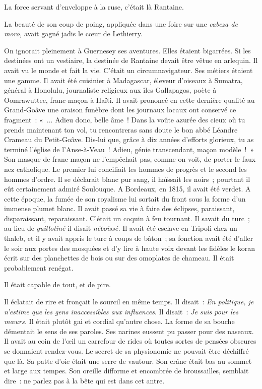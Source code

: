 \documentclass[french,twoside]{book} %
\begin{document}
La force servant d’enveloppe à la ruse, c’était là Rantaine.\par
La beauté de son coup de poing, appliquée dans une foire sur une \emph{cabeza de moro,} avait gagné jadis le cœur de Lethierry.\par
On ignorait pleinement à Guernesey ses aventures. Elles étaient bigarrées. Si les destinées ont un vestiaire, la destinée de Rantaine devait être vêtue en arlequin. Il avait vu le monde et fait la vie. C’était un circumnavigateur. Ses métiers étaient une gamme. Il avait été cuisinier à Madagascar, éleveur d’oiseaux à Sumatra, général à Honolulu, journaliste religieux aux îles Gallapagos, poète à Oomrawuttee, franc-maçon à Haïti. Il avait prononcé en cette dernière qualité au Grand-Goâve une oraison funèbre dont les journaux locaux ont conservé ce fragment : « ... Adieu donc, belle âme ! Dans la voûte azurée des cieux où tu prends maintenant ton vol, tu rencontreras sans doute le bon abbé Léandre Crameau du Petit-Goâve. Dis-lui que, grâce à dix années d’efforts glorieux, tu as terminé l’église de l’Anse-à-Veau ! Adieu, génie transcendant, maçon modèle ! » Son masque de franc-maçon ne  l’empêchait pas, comme on voit, de porter le faux nez catholique. Le premier lui conciliait les hommes de progrès et le second les hommes d’ordre. Il se déclarait blanc pur sang, il haïssait les noirs ; pourtant il eût certainement admiré Soulouque. A Bordeaux, en 1815, il avait été verdet. A cette époque, la fumée de son royalisme lui sortait du front sous la forme d’un immense plumet blanc. Il avait passé sa vie à faire des éclipses, paraissant, disparaissant, reparaissant. C’était un coquin à feu tournant. Il savait du turc ; au lieu de \emph{guillotiné} il disait \emph{néboissé.} Il avait été esclave en Tripoli chez un thaleb, et il y avait appris le turc à coups de bâton ; sa fonction avait été d’aller le soir aux portes des mosquées et d’y lire à haute voix devant les fidèles le koran écrit sur des planchettes de bois ou sur des omoplates de chameau. Il était probablement renégat.\par
Il était capable de tout, et de pire.\par
Il éclatait de rire et fronçait le sourcil en même temps. Il disait : \emph{En politique, je n’estime que les gens inaccessibles aux influences}. Il disait : \emph{Je suis pour les mœurs.} Il était plutôt gai et cordial qu’autre chose. La forme de sa bouche démentait le sens de ses paroles. Ses narines eussent pu passer pour des naseaux. Il avait au coin de l’œil un carrefour de rides où toutes sortes de pensées obscures se donnaient rendez-vous. Le secret de sa physionomie ne pouvait être déchiffré que là. Sa patte d’oie était une serre de vautour. Son crâne était bas au sommet et large aux tempes. Son oreille difforme et encombrée de broussailles,  semblait dire : ne parlez pas à la bête qui est dans cet antre.\par
\end{document}
